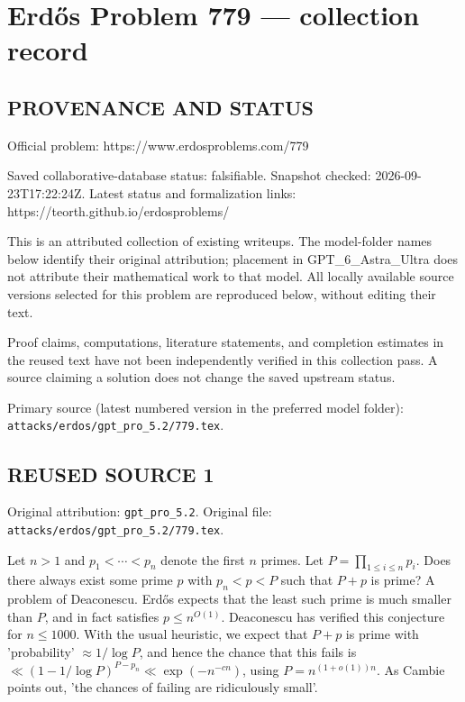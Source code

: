 \section*{Erd\H{o}s Problem 779 --- collection record}

\subsection*{PROVENANCE AND STATUS}
Official problem: https://www.erdosproblems.com/779

Saved collaborative-database status: falsifiable.
Snapshot checked: 2026-09-23T17:22:24Z.
Latest status and formalization links: https://teorth.github.io/erdosproblems/

This is an attributed collection of existing writeups. The model-folder names below identify their original attribution; placement in GPT\_6\_Astra\_Ultra does not attribute their mathematical work to that model. All locally available source versions selected for this problem are reproduced below, without editing their text.

Proof claims, computations, literature statements, and completion estimates in the reused text have not been independently verified in this collection pass. A source claiming a solution does not change the saved upstream status.

Primary source (latest numbered version in the preferred model folder): \texttt{attacks/erdos/gpt\_pro\_5.2/779.tex}.

\subsection*{REUSED SOURCE 1}
Original attribution: \texttt{gpt\_pro\_5.2}.
Original file: \texttt{attacks/erdos/gpt\_pro\_5.2/779.tex}.


Let $n> 1$ and $p_1<\cdots<p_n$ denote the first $n$ primes. Let $P=\prod_{1\leq i\leq n}p_i$. Does there always exist some prime $p$ with $p_n<p<P$ such that $P+p$ is prime? A problem of Deaconescu. Erd\H{o}s expects that the least such prime is much smaller than $P$, and in fact satisfies $p\leq n^{O(1)}$. Deaconescu has verified this conjecture for $n\leq 1000$. With the usual heuristic, we expect that $P+p$ is prime with 'probability' $\approx 1/\log P$, and hence the chance that this fails is $\ll (1-1/\log P)^{P-p_n}\ll \exp(-n^{-cn})$, using $P=n^{(1+o(1))n}$. As Cambie points out, 'the chances of failing are ridiculously small'.



